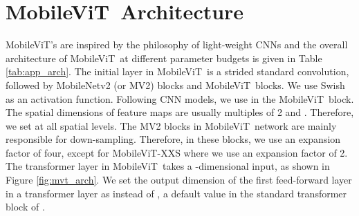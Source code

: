 \documentclass[preprint]{article} \usepackage{iclr2022_conference,times}
\newcommand{\arch}{MobileViT}
\begin{document}



\clearpage

\appendix

\section{\arch~Architecture}
\label{sec:ablation_arch}

\arch's are inspired by the philosophy of light-weight CNNs and the overall architecture of \arch~at different parameter budgets is given in Table \ref{tab:app_arch}.  The initial layer in \arch~is a strided  standard convolution, followed by MobileNetv2 (or MV2) blocks and \arch~blocks. We use Swish \citep{elfwing2018sigmoid} as an activation function. Following CNN models, we use  in the \arch~block. The spatial dimensions of feature maps are usually multiples of 2 and . Therefore, we set  at all spatial levels. The MV2 blocks in \arch~network are mainly responsible for down-sampling. Therefore, in these blocks, we use an expansion factor of four, except for \arch-XXS where we use an expansion factor of 2. The transformer layer in \arch~takes a -dimensional input, as shown in Figure \ref{fig:mvt_arch}. We set the output dimension of the first feed-forward layer in a transformer layer as  instead of , a default value in the standard transformer block of \citet{vaswani2017attention}.
\end{document}
